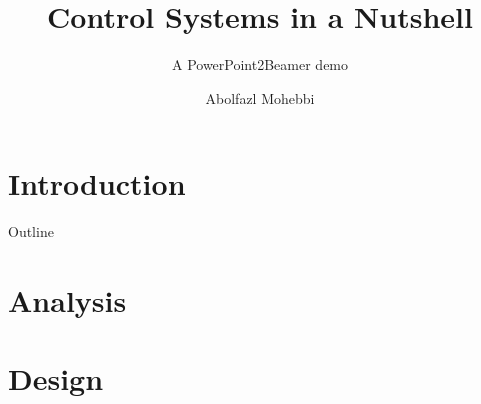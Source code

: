 \documentclass[aspectratio=43]{beamer}
\title{Control Systems in a Nutshell}
\subtitle{A PowerPoint2Beamer demo}
\author{Abolfazl Mohebbi}
\begin{document}
\section{Introduction}

\begin{frame}{Outline}\tableofcontents\end{frame}



\section{Analysis}





\section{Design}

\end{document}

